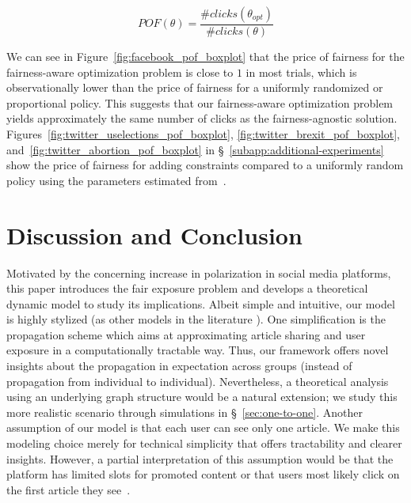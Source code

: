 \documentclass[letterpaper]{article} %
\begin{document}
\footnotesize
\begin{equation}\label{eq:price-of-fairness}
    POF(\theta) = \frac{\# clicks(\theta_{opt})}{\# clicks(\theta)}
\end{equation}
\normalsize

We can see in Figure~\ref{fig:facebook_pof_boxplot} that the price of fairness for the fairness-aware optimization problem is close to $1$ in most trials, which is observationally lower than the price of fairness for a uniformly randomized or proportional policy.
This suggests that our fairness-aware optimization problem yields approximately the same number of clicks as the fairness-agnostic solution. 
%
Figures~\ref{fig:twitter_uselections_pof_boxplot}, \ref{fig:twitter_brexit_pof_boxplot}, and~\ref{fig:twitter_abortion_pof_boxplot} in \S~\ref{subapp:additional-experiments} show the price of fairness for adding constraints compared to a uniformly random policy using the parameters estimated from~\citet{balancedExposure}. 
%


\section{Discussion and Conclusion}\label{sec:discussion_and_limitations}

Motivated by the concerning increase in polarization in social media platforms, this paper introduces the fair exposure problem and develops a theoretical dynamic model to study its implications. 
%
Albeit simple and intuitive, our model is highly stylized (as other models in the literature \citep{papanastasiou2020fake, allon2019information}).
%
One simplification is the propagation scheme which aims at approximating article sharing and user exposure in a computationally tractable way. 
%
Thus, our framework offers novel insights about the propagation in expectation across groups (instead of propagation from individual to individual).
%
Nevertheless, a theoretical analysis using an underlying graph structure would be a natural extension; we study this more realistic scenario through simulations in \S~\ref{sec:one-to-one}.
%
Another assumption of our model is that each user can see only one article.
%
We make this modeling choice merely for technical simplicity that offers tractability and clearer insights.
%
However, a partial interpretation of this assumption would be that the platform has limited slots for promoted content or that users most likely click on the first article they see~\citep{robertson1978ranking,wang2013incorporating,craswell2008experimental}.
\end{document}
